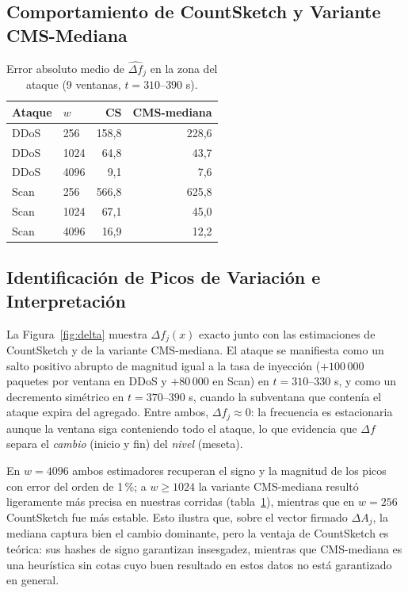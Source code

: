 \documentclass[10pt,a4paper]{article}
\begin{document}
\subsection{Comportamiento de CountSketch y Variante CMS-Mediana}

\begin{table}[!htbp]
\centering\small
\caption{Error absoluto medio de $\widehat{\Delta f}_j$ en la zona del ataque (9 ventanas, $t=310$--$390$ s).}
\label{tab:delta}
\begin{tabular}{llrr}
\toprule
Ataque & $w$ & CS & CMS-mediana \\
\midrule
DDoS & 256  & 158,8 & 228,6 \\
DDoS & 1024 & 64,8  & 43,7 \\
DDoS & 4096 & 9,1   & 7,6 \\
Scan & 256  & 566,8 & 625,8 \\
Scan & 1024 & 67,1  & 45,0 \\
Scan & 4096 & 16,9  & 12,2 \\
\bottomrule
\end{tabular}
\end{table}

\subsection{Identificación de Picos de Variación e Interpretación}

La Figura~\ref{fig:delta} muestra $\Delta f_j(x)$ exacto junto con las estimaciones de CountSketch y de la variante CMS-mediana. El ataque se manifiesta como un salto positivo abrupto de magnitud igual a la tasa de inyección ($+100\,000$ paquetes por ventana en DDoS y $+80\,000$ en Scan) en $t=310$--$330$ s, y como un decremento simétrico en $t=370$--$390$ s, cuando la subventana que contenía el ataque expira del agregado. Entre ambos, $\Delta f_j\approx 0$: la frecuencia es estacionaria aunque la ventana siga conteniendo todo el ataque, lo que evidencia que $\Delta f$ separa el \emph{cambio} (inicio y fin) del \emph{nivel} (meseta).

En $w=4096$ ambos estimadores recuperan el signo y la magnitud de los picos con error del orden de 1\,\%; a $w\ge 1024$ la variante CMS-mediana resultó ligeramente más precisa en nuestras corridas (tabla~\ref{tab:delta}), mientras que en $w=256$ CountSketch fue más estable. Esto ilustra que, sobre el vector firmado $\Delta A_j$, la mediana captura bien el cambio dominante, pero la ventaja de CountSketch es teórica: sus hashes de signo garantizan insesgadez, mientras que CMS-mediana es una heurística sin cotas cuyo buen resultado en estos datos no está garantizado en general.
\end{document}
